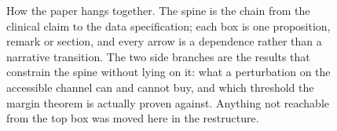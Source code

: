 \begin{figure}[htbp]
{}
\caption{How the paper hangs together. The spine is the chain from the clinical claim to the
data specification; each box is one proposition, remark or section, and every arrow is a
dependence rather than a narrative transition. The two side branches are the results that
constrain the spine without lying on it: what a perturbation on the accessible channel can
and cannot buy, and which threshold the margin theorem is actually proven against. Anything
not reachable from the top box was moved here in the restructure.}
\label{fig:deps}
\end{figure}


